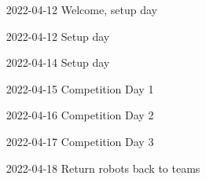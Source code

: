 \begin{itemize}[leftmargin=*,labelsep=0.7cm, labelindent=2cm]
    \item [2022-04-12] Welcome, setup day
    \item [2022-04-12] Setup day
    \item [2022-04-14] Setup day
    \item [2022-04-15] Competition Day 1
    \item [2022-04-16] Competition Day 2
    \item [2022-04-17] Competition Day 3
    \item [2022-04-18] Return robots back to teams
\end{itemize}
